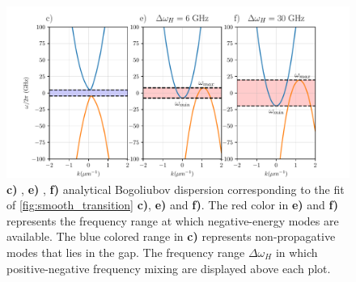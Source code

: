 \begin{figure}[t!]
    \centering
    \includegraphics[width=1\textwidth]{chap_custom_st/fig/max_freq_hawking.pdf}
    \caption{\textbf{c)} , \textbf{e)} , \textbf{f)} analytical Bogoliubov dispersion corresponding to the fit of \autoref{fig:smooth_transition} \textbf{c)}, \textbf{e)} and \textbf{f)}. The red color in \textbf{e)} and \textbf{f)} represents the frequency range at which negative-energy modes
    are available. The blue colored range in \textbf{c)} represents non-propagative modes that lies in the gap. The frequency range $\Delta \omega_H$ in which positive-negative frequency mixing are displayed above each plot.}
    \label{fig:hawking_range}
\end{figure}


